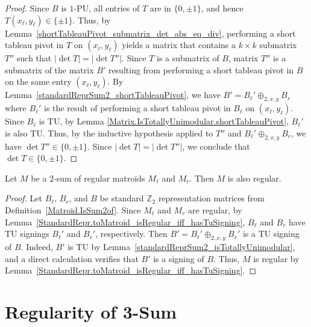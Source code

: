 \begin{proof}
    Since $B$ is $1$-PU, all entries of $T$ are in $\{0, \pm 1\}$, and hence $T (x_{\ell}, y_{\ell}) \in \{\pm 1\}$. Thus, by Lemma~\ref{shortTableauPivot_submatrix_det_abs_eq_div}, performing a short tableau pivot in $T$ on $(x_{\ell}, y_{\ell})$ yields a matrix that contains a $k \times k$ submatrix $T''$ such that $|\det T| = |\det T''|$. Since $T$ is a submatrix of $B$, matrix $T''$ is a submatrix of the matrix $B'$ resulting from performing a short tableau pivot in $B$ on the same entry $(x_{\ell}, y_{\ell})$. By Lemma~\ref{standardReprSum2_shortTableauPivot}, we have $B' = B_{\ell}' \oplus_{2, x, y} B_{r}$ where $B_{\ell}'$ is the result of performing a short tableau pivot in $B_{\ell}$ on $(x_{\ell}, y_{\ell})$. Since $B_{\ell}$ is TU, by Lemma \ref{Matrix.IsTotallyUnimodular.shortTableauPivot}, $B_{\ell}'$ is also TU. Thus, by the inductive hypothesis applied to $T''$ and $B_{\ell}' \oplus_{2, x, y} B_{r}$, we have $\det T'' \in \{0, \pm 1\}$. Since $|\det T| = |\det T''|$, we conclude that $\det T \in \{0, \pm 1\}$.
\end{proof}

\begin{theorem}
    \label{Matroid.IsSum2of.isRegular}
    \leanok
    Let $M$ be a $2$-sum of regular matroids $M_{\ell}$ and $M_{r}$. Then $M$ is also regular.
\end{theorem}

\begin{proof}
    \leanok
    Let $B_{\ell}$, $B_{r}$, and $B$ be standard $\mathbb{Z}_{2}$ representation matrices from Definition~\ref{Matroid.IsSum2of}. Since $M_{\ell}$ and $M_{r}$ are regular, by Lemma~\ref{StandardRepr.toMatroid_isRegular_iff_hasTuSigning}, $B_{\ell}$ and $B_{r}$ have TU signings $B_{\ell}'$ and $B_{r}'$, respectively. Then $B' = B_{\ell}' \oplus_{2, x, y} B_{r}'$ is a TU signing of $B$. Indeed, $B'$ is TU by Lemma~\ref{standardReprSum2_isTotallyUnimodular}, and a direct calculation verifies that $B'$ is a signing of $B$. Thus, $M$ is regular by Lemma~\ref{StandardRepr.toMatroid_isRegular_iff_hasTuSigning}.
\end{proof}


\chapter{Regularity of 3-Sum}

